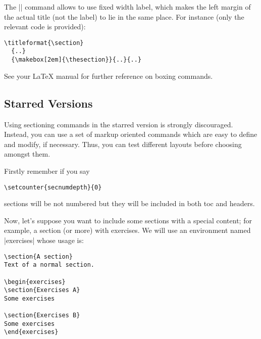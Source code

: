 \documentclass[a4paper]{ltxguide}
\begin{document}
The |\makebox| command allows to use fixed width label, which
makes the left margin of the actual title (not the label) to lie
in the same place. For instance (only the relevant code is
provided):
\begin{verbatim}
\titleformat{\section}
  {..}
  {\makebox[2em]{\thesection}}{..}{..}
\end{verbatim}

See your \LaTeX{} manual for further reference on boxing commands.

\subsection{Starred Versions}
\label{s:starred}

Using sectioning commands in the starred version is strongly 
discouraged.  Instead, you can use a set of markup oriented commands 
which are easy to define and modify, if necessary.  Thus, you can test 
different layouts before choosing amongst them.

Firstly remember if you say
\begin{verbatim}
\setcounter{secnumdepth}{0}
\end{verbatim}
sections will be not numbered but they will be included in both toc
and headers.

Now, let's
suppose you want to include some sections with a special content;
for example, a section (or more) with exercises. We will use an
environment named |exercises| whose usage is:
\begin{verbatim}
\section{A section}
Text of a normal section.

\begin{exercises}
\section{Exercises A}
Some exercises

\section{Exercises B}
Some exercises
\end{exercises}
\end{verbatim}
\end{document}
